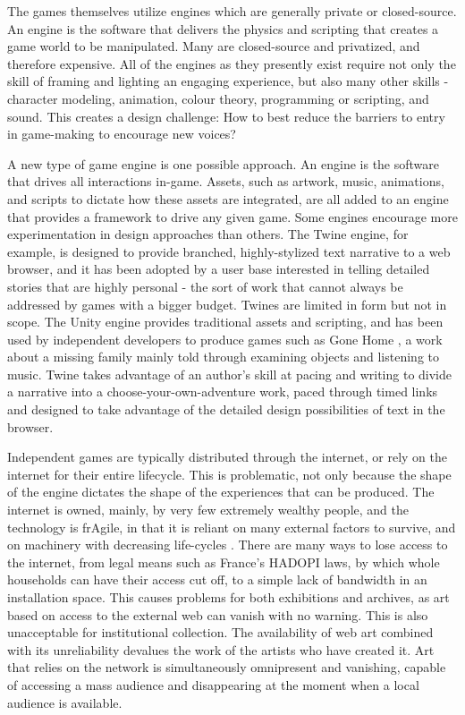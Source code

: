 The games themselves utilize engines which are generally private or closed-source. An engine is the software that delivers the physics and scripting that creates a game world to be manipulated. Many are closed-source and privatized, and therefore expensive. All of the engines as they presently exist require not only the skill of framing and lighting an engaging experience, but also many other skills - character modeling, animation, colour theory, programming or scripting, and sound. This creates a design challenge: How to best reduce the barriers to entry in game-making to encourage new voices?

A new type of game engine is one possible approach. An engine is the software that drives all interactions in-game. Assets, such as artwork, music, animations, and scripts to dictate how these assets are integrated, are all added to an engine that provides a framework to drive any given game. Some engines encourage more experimentation in design approaches than others. The Twine engine, for example, is designed to provide branched, highly-stylized text narrative to a web browser, and it has been adopted by a user base interested in telling detailed stories that are highly personal - the sort of work that cannot always be addressed by games with a bigger budget. Twines are limited in form but not in scope. The Unity engine provides traditional assets and scripting, and has been used by independent developers to produce games such as Gone Home \parencite{fullbrightco}, a work about a missing family mainly told through examining objects and listening to music. Twine takes advantage of an author's skill at pacing and writing to divide a narrative into a choose-your-own-adventure work, paced through timed links and designed to take advantage of the detailed design possibilities of text in the browser.

Independent games are typically distributed through the internet, or rely on the internet for their entire lifecycle. This is problematic, not only because the shape of the engine dictates the shape of the experiences that can be produced. The internet is owned, mainly, by very few extremely wealthy people, and the technology is frAgile, in that it is reliant on many external factors to survive, and on machinery with decreasing life-cycles \parencite{lisanotes}. There are many ways to lose access to the internet, from legal means such as France's HADOPI laws, by which whole households can have their access cut off, to a simple lack of bandwidth in an installation space. This causes problems for both exhibitions and archives, as art based on access to the external web can vanish with no warning. This is also unacceptable for institutional collection. The availability of web art combined with its unreliability devalues the work of the artists who have created it. Art that relies on the network is simultaneously omnipresent and vanishing, capable of accessing a mass audience and disappearing at the moment when a local audience is available.

